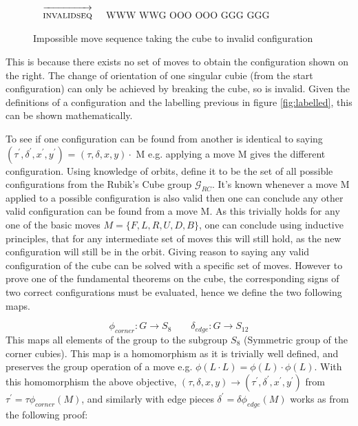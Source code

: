 \documentclass{article}
\newcounter{theo}[section]\setcounter{theo}{0}
\newcounter{lem}[section]\setcounter{lem}{0}
\begin{document}
\newcommand{\invalidseq}{[invalidseq],F2,F2}%
\newcommand{\invalidseqarrow}{$\quad\overrightarrow{\strut\textsc{invalidseq}}\quad$}

\begin{figure}
\centering
  \RubikCubeSolved%
  \invalidseqarrow
  \RubikRotation{\invalidseq}
   {W}{W}{W} {W}{W}{G}%
   {O}{O}{O} {O}{O}{O}%
   {G}{G}{G} {G}{G}{G}%
\caption{Impossible move sequence taking the cube to invalid configuration}
\label{fig:invalid}
\end{figure}
\vspace{20pt}
This is because there exists no set of moves to obtain the configuration shown on the right. The change of orientation of one singular cubie (from the start configuration) can only be achieved by breaking the cube, so is invalid. Given the definitions of a configuration and the labelling previous in figure \ref{fig:labelled}, this can be shown mathematically. 


To see if one configuration can be found from another is identical to saying $(\tau^{'} ,\delta^{'} , x^{'} , y^{'} )$ = $(\tau,\delta, x, y) \cdot$ M e.g. applying a move M gives the different configuration. Using knowledge of orbits, define it to be the set of all possible configurations from the Rubik's Cube group $\mathcal{G}_{RC}$. It's known whenever a move M applied to a possible configuration is also valid then one can conclude any other valid configuration can be found from a move M. As this trivially holds for any one of the basic moves $M= \{{F,L,R,U,D,B}\}$, one can conclude using inductive principles, that for any intermediate set of moves this will still hold, as the new configuration will still be in the orbit. Giving reason to saying any valid configuration of the cube can be solved with a specific set of moves. However to prove one of the fundamental theorems on the cube, the corresponding signs of two correct configurations must be evaluated, hence we define the two following maps.


\begin{equation}\label{onto}
\phi_{corner}: G \rightarrow S_{8}\quad \quad 
\delta_{edge}: G \rightarrow S_{12}
\end{equation}
This maps all elements of the group to the subgroup $S_{8}$ (Symmetric group of the corner cubies). This map is a homomorphism as it is trivially well defined, and preserves the group operation of a move e.g. $\phi (L \cdot L) = \phi (L) \cdot \phi(L)$. With this homomorphism the above objective, $(\tau,\delta, x, y) \longrightarrow (\tau^{'},\delta^{'}, x^{'}, y^{'})$ from $\tau^{'} = \tau\phi_{corner}(M) $, and similarly with edge pieces $\delta^{'} = \delta\phi_{edge}(M) $ works as from the following proof:
\end{document}
